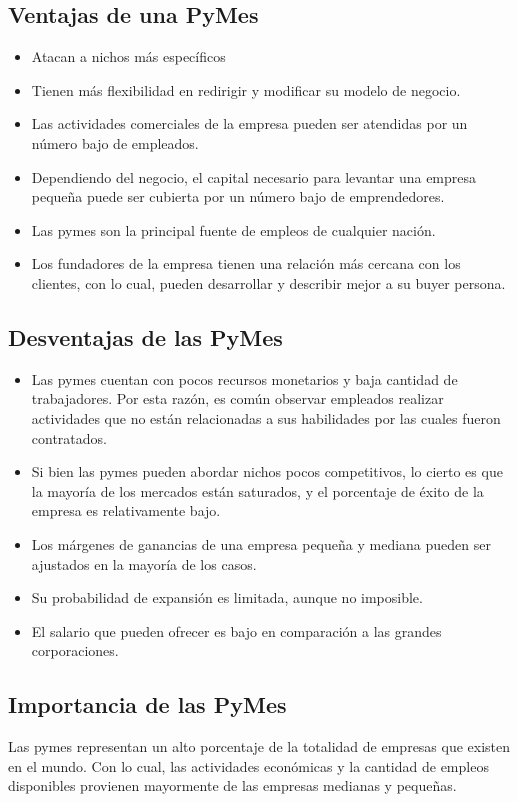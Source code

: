 \documentclass[letterpaper,12pt]{article}
\begin{document}
\begin{sloppypar}
\subsection{Ventajas de una PyMes}
\begin{itemize}
    \item Atacan a nichos más específicos 
    \item Tienen más flexibilidad en redirigir y modificar su modelo de negocio.
    \item Las actividades comerciales de la empresa pueden ser atendidas por un número bajo de empleados.
    \item Dependiendo del negocio, el capital necesario para levantar una empresa pequeña puede ser cubierta por un número bajo de emprendedores.
    \item Las pymes son la principal fuente de empleos de cualquier nación.
    \item Los fundadores de la empresa tienen una relación más cercana con los clientes, con lo cual, pueden desarrollar y describir mejor a su buyer persona.
\end{itemize}
\subsection{Desventajas de las PyMes}
\begin{itemize}
    \item Las pymes cuentan con pocos recursos monetarios y baja cantidad de trabajadores. Por esta razón, es común observar empleados realizar actividades que no están relacionadas a sus habilidades por las cuales fueron contratados.
    \item Si bien las pymes pueden abordar nichos pocos competitivos, lo cierto es que la mayoría de los mercados están saturados, y el porcentaje de éxito de la empresa es relativamente bajo.
    \item Los márgenes de ganancias de una empresa pequeña y mediana pueden ser ajustados en la mayoría de los casos.
    \item Su probabilidad de expansión es limitada, aunque no imposible.
    \item El salario que pueden ofrecer es bajo en comparación a las grandes corporaciones.
\end{itemize}
\subsection{Importancia de las PyMes}
Las pymes representan un alto porcentaje de la totalidad de empresas que existen en el mundo. Con lo cual, las actividades económicas y la cantidad de empleos disponibles provienen mayormente de las empresas medianas y pequeñas.


\end{sloppypar}
\end{document}
